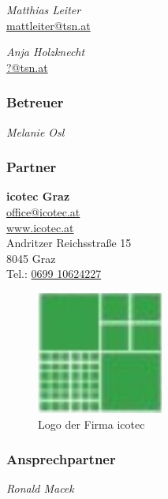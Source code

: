 \emph{Matthias Leiter} \\
\href{mailto:mattleiter@tsn.at}{mattleiter@tsn.at} 
\begin{figure}
\end{figure}

\emph{Anja Holzknecht} \\
\href{mailto:?@tsn.at}{?@tsn.at} 
\begin{figure}
\end{figure}

\subsubsection{Betreuer}
\emph{Melanie Osl}

\subsubsection{Partner}
\textbf{icotec Graz} \\
\href{mailto:office@icotec.at}{office@icotec.at} \\
\href{www.icotec.at}{www.icotec.at} \\
Andritzer Reichsstraße 15 \\
8045 Graz \\
Tel.: \href{tel:069910624227}{0699 10624227}
\begin{figure}[H]
	\captionsetup{singlelinecheck = false, format= hang, justification=raggedright, font=footnotesize, labelsep=space}
	\includegraphics{Logo_Projektpartner.png}
	\caption{Logo der Firma icotec}
	\label{fig:LogoProjektpartner}
\end{figure}

\subsubsection{Ansprechpartner}
\emph {Ronald Macek}
\begin{figure}
\end{figure}


